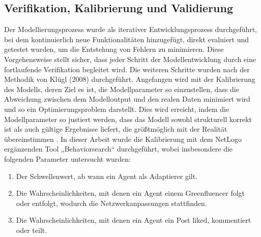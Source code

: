 \documentclass[runningheads]{llncs}
\begin{document}
\subsection{Verifikation, Kalibrierung und Validierung}
Der Modellierungsprozess wurde als iterativer Entwicklungsprozess durchgeführt, bei dem kontinuierlich neue Funktionalitäten hinzugefügt, direkt evaluiert und getestet wurden, um die Entstehung von Fehlern zu minimieren. Diese Vorgehensweise stellt sicher, dass jeder Schritt der Modellentwicklung durch eine fortlaufende Verifikation begleitet wird. 
Die weiteren Schritte wurden nach der Methodik von Klügl (2008) durchgeführt. Angefangen wird mit der Kalibrierung des Modells, deren Ziel es ist, die Modellparameter so einzustellen, dass die Abweichung zwischen dem Modelloutput und den realen Daten minimiert wird und so ein Optimierungsproblem darstellt. Dies wird erreicht, indem die Modellparameter so justiert werden, dass das Modell sowohl strukturell korrekt ist als auch gültige Ergebnisse liefert, die größtmöglich mit der Realität übereinstimmen \cite{klugl_validation_2008}. In dieser Arbeit wurde die Kalibrierung mit dem NetLogo ergänzenden Tool „Behaviorsearch“ durchgeführt, wobei insbesondere die folgenden Parameter untersucht wurden:

\begin{enumerate}
  \item Der Schwellenwert, ab wann ein Agent als Adaptierer gilt.
  \item Die Wahrscheinlichkeiten, mit denen ein Agent einem Greenfluencer folgt oder entfolgt, wodurch die Netzwerkanpassungen stattfinden. 
  \item Die Wahrscheinlichkeiten, mit denen ein Agent ein Post liked, kommentiert oder teilt. 
\end{enumerate}
\end{document}
